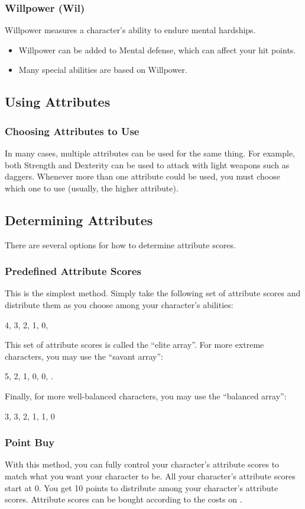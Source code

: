 \subsubsection{Willpower (Wil)}\label{Willpower}
Willpower measures a character's ability to endure mental hardships.
\begin{itemize}
    \item Willpower can be added to Mental defense, which can affect your hit points.
    \item Many special abilities are based on Willpower.
\end{itemize}

\subsection{Using Attributes}

\subsubsection{Choosing Attributes to Use}
In many cases, multiple attributes can be used for the same thing.
For example, both Strength and Dexterity can be used to attack with light weapons such as daggers.
Whenever more than one attribute could be used, you must choose which one to use (usually, the higher attribute).

\subsection{Determining Attributes}
There are several options for how to determine attribute scores.

\subsubsection{Predefined Attribute Scores}
This is the simplest method.
Simply take the following set of attribute scores and distribute them as you choose among your character's abilities:

4, 3, 2, 1, 0, 

This set of attribute scores is called the ``elite array''.
For more extreme characters, you may use the ``savant array'':

5, 2, 1, 0, 0, .

Finally, for more well-balanced characters, you may use the ``balanced array'':

3, 3, 2, 1, 1, 0

\subsubsection{Point Buy}
With this method, you can fully control your character's attribute scores to match what you want your character to be.
All your character's attribute scores start at 0.
You get 10 points to distribute among your character's attribute scores.
Attribute scores can be bought according to the costs on .

